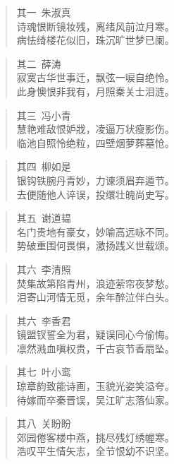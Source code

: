\documentclass[12pt,oneside]{book}
\newenvironment{shici}{%
\begin{verse}%
\centering\large\hspace{12pt}}%
{\end{verse}}
\begin{document}
\begin{shici}
其一~朱淑真\\
诗魂恨断镜妆残，离绪风前泣月寒。\\
病怯绮楼花似旧，珠沉旷世梦已阑。
\end{shici}


\begin{shici}
其二~薛涛\\
寂寞古华世事迁，飘弦一唳自绝怜。\\
此身懊恨非我有，月照秦关士泪涟。
\end{shici}

\begin{shici}
其三~冯小青\\
慧艳难敌恨妒戕，凌逼万状瘦影伤。\\
临池自照怜绝粒，四壁烟萝葬墓怆。
\end{shici}

\begin{shici}
其四~柳如是\\
银钩铁腕丹青妙，力谏须眉弃遁节。\\
去便随他人谇误，投缳壮魄尚史写。
\end{shici}

\begin{shici}
其五~谢道韫\\
名门贵地有豪女，妙喻高远咏不同。\\
势破重围何畏惧，激扬践义世载颂。
\end{shici}

\begin{shici}
其六~李清照\\
焚集故第陷青州，浪迹萦帘夜梦愁。\\
泪寄山河情无觅，余年醉泣伴白头。
\end{shici}

\begin{shici}
其六~李香君\\
镜盟钗誓全为君，疑误同心今偷悔。\\
凛然溅血嗔权贵，千古哀节香扇坠。
\end{shici}

\begin{shici}
其七~叶小鸾\\
琼章韵致能诗画，玉貌光姿笑溢夸。\\
待嫁而卒秦晋误，吴江旷志落仙家。
\end{shici}

\begin{shici}
其八~关盼盼\\
郊园倦客楼中燕，挑尽残灯绣幄寒。\\
浩叹平生情矢志，全节恨幼不识坚。
\end{shici}
\end{document}
